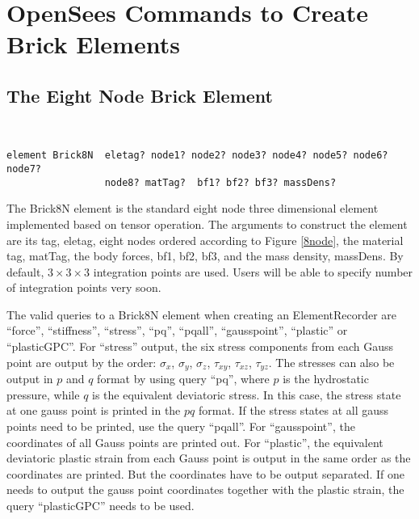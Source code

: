 \section{OpenSees Commands to Create Brick Elements }

\subsection{The Eight Node Brick Element} \
\begin{verbatim}
element Brick8N  eletag? node1? node2? node3? node4? node5? node6? node7?
                 node8? matTag?  bf1? bf2? bf3? massDens?
\end{verbatim}
The   Brick8N   element   is  the  standard  eight  node  three
dimensional  element implemented based on tensor operation. The
arguments  to  construct the element are its tag, eletag, eight
nodes  ordered  according  to  Figure \ref{8node}, the material
tag,  matTag,  the  body  forces,  bf1,  bf2, bf3, and the mass
density, massDens. By default, $3\times 3 \times 3$ integration
points  are  used.  Users  will  be  able  to specify number of
integration points very soon.

The  valid  queries  to  a  Brick8N  element  when  creating an
ElementRecorder   are   ``force'',  ``stiffness'',  ``stress'',
``pq'',     ``pqall'',     ``gausspoint'',    ``plastic''    or
``plasticGPC''.   
%
For   ``stress''   output,   the  six  stress
components  from  each  Gauss  point  are  output by the order:
$\sigma_x$, $\sigma_y$, $\sigma_z$, $\tau_{xy}$,
$\tau_{xz}$,  $\tau_{yz}$. 
%
The  stresses can also be output in $p$ and $q$ format by using
query  ``pq'', where $p$ is the hydrostatic pressure, while $q$
is  the  equivalent deviatoric stress. In this case, the stress
state  at one gauss point is printed in the $pq$ format. If the
stress  states  at all gauss points need to be printed, use the
query ``pqall''.
%
For  ``gausspoint'',  the  coordinates  of all Gauss points are
printed out.
%
For  ``plastic'', the equivalent deviatoric plastic strain from
each Gauss point is output in the same order as the coordinates
are printed. But the coordinates have to be output separated.
%
If  one  needs  to  output the gauss point coordinates together
with the plastic strain, the query ``plasticGPC'' needs to be used.




